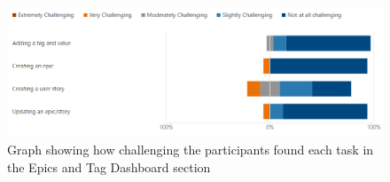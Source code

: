 \documentclass[l4proj.tex]{subfiles}
\begin{document}
\begin{figure}[h!]
\begin{center}
\includegraphics[scale=0.5]{dissertation/images/EvaluationEpicsAndTagsChallengingGraph.png}
\caption{Graph showing how challenging the participants found each task in the Epics and Tag Dashboard section}
\label{fig:epic and tag form feedback} 
\end{center}
\end{figure}
\end{document}
